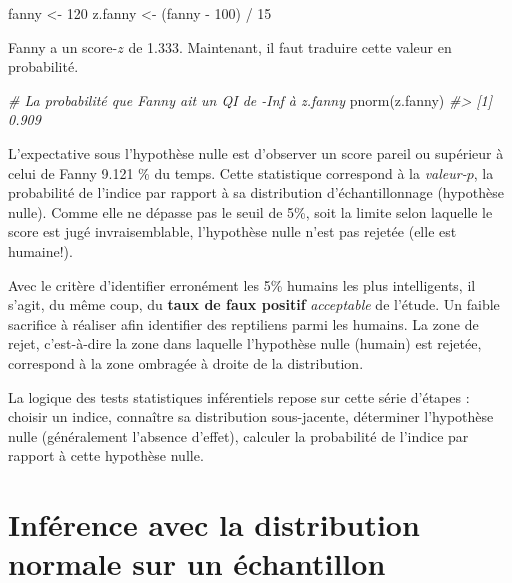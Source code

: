 \documentclass[
]{book}
\newenvironment{Shaded}{}{}
\newcommand{\CommentTok}[1]{\textit{#1}}
\newcommand{\DecValTok}[1]{#1}
\newcommand{\FunctionTok}[1]{#1}
\newcommand{\NormalTok}[1]{#1}
\newcommand{\OtherTok}[1]{#1}
\newcommand{\SpecialCharTok}[1]{#1}
\begin{document}
\begin{Shaded}
\begin{Highlighting}[]
\NormalTok{fanny }\OtherTok{\textless{}{-}} \DecValTok{120}
\NormalTok{z.fanny }\OtherTok{\textless{}{-}}\NormalTok{ (fanny }\SpecialCharTok{{-}} \DecValTok{100}\NormalTok{) }\SpecialCharTok{/} \DecValTok{15}
\end{Highlighting}
\end{Shaded}

Fanny a un score-\(z\) de 1.333. Maintenant, il faut traduire cette valeur en probabilité.

\begin{Shaded}
\begin{Highlighting}[]
\CommentTok{\# La probabilité que Fanny ait un QI de {-}Inf à z.fanny}
\FunctionTok{pnorm}\NormalTok{(z.fanny)}
\CommentTok{\#\textgreater{} [1] 0.909}
\end{Highlighting}
\end{Shaded}

L'expectative sous l'hypothèse nulle est d'observer un score pareil ou supérieur à celui de Fanny 9.121 \% du temps. Cette statistique correspond à la \emph{valeur-\(p\)}, la probabilité de l'indice par rapport à sa distribution d'échantillonnage (hypothèse nulle). Comme elle ne dépasse pas le seuil de 5\%, soit la limite selon laquelle le score est jugé invraisemblable, l'hypothèse nulle n'est pas rejetée (elle est humaine!).

Avec le critère d'identifier erronément les 5\% humains les plus intelligents, il s'agit, du même coup, du \textbf{taux de faux positif} \emph{acceptable} de l'étude. Un faible sacrifice à réaliser afin identifier des reptiliens parmi les humains. La zone de rejet, c'est-à-dire la zone dans laquelle l'hypothèse nulle (humain) est rejetée, correspond à la zone ombragée à droite de la distribution.

La logique des tests statistiques inférentiels repose sur cette série d'étapes : choisir un indice, connaître sa distribution sous-jacente, déterminer l'hypothèse nulle (généralement l'absence d'effet), calculer la probabilité de l'indice par rapport à cette hypothèse nulle.

\hypertarget{infuxe9rence-avec-la-distribution-normale-sur-un-uxe9chantillon}{%
\section{Inférence avec la distribution normale sur un échantillon}\label{infuxe9rence-avec-la-distribution-normale-sur-un-uxe9chantillon}}
\end{document}
